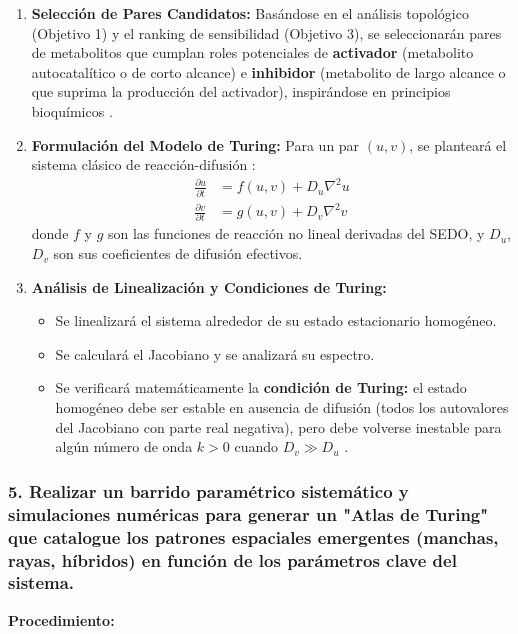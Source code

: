 \documentclass[12pt,spanish]{article}
\newcommand{\procedimiento}{\textbf{Procedimiento:}}
\begin{document}
	\begin{enumerate}
		\item \textbf{Selección de Pares Candidatos:} Basándose en el análisis topológico (Objetivo 1) y el ranking de sensibilidad (Objetivo 3), se seleccionarán pares de metabolitos que cumplan roles potenciales de \textbf{activador} (metabolito autocatalítico o de corto alcance) e \textbf{inhibidor} (metabolito de largo alcance o que suprima la producción del activador), inspirándose en principios bioquímicos \cite{Kondo2010}.
		
		\item \textbf{Formulación del Modelo de Turing:} Para un par $(u, v)$, se planteará el sistema clásico de reacción-difusión \cite{turing1952}:
		\begin{align*}
			\frac{\partial u}{\partial t} &= f(u,v) + D_u \nabla^2 u \\
			\frac{\partial v}{\partial t} &= g(u,v) + D_v \nabla^2 v
		\end{align*}
		donde $f$ y $g$ son las funciones de reacción no lineal derivadas del SEDO, y $D_u$, $D_v$ son sus coeficientes de difusión efectivos.
		
		\item \textbf{Análisis de Linealización y Condiciones de Turing:}
		\begin{itemize}
			\item Se linealizará el sistema alrededor de su estado estacionario homogéneo.
			\item Se calculará el Jacobiano y se analizará su espectro.
			\item Se verificará matemáticamente la \textbf{condición de Turing:} el estado homogéneo debe ser estable en ausencia de difusión (todos los autovalores del Jacobiano con parte real negativa), pero debe volverse inestable para algún número de onda $k > 0$ cuando $D_v \gg D_u$ \cite{alarcon2004, murray2012}.
		\end{itemize}
	\end{enumerate}
	
	\subsubsection*{5. Realizar un barrido paramétrico sistemático y simulaciones numéricas para generar un "Atlas de Turing" que catalogue los patrones espaciales emergentes (manchas, rayas, híbridos) en función de los parámetros clave del sistema.}
	
	\procedimiento
	
\end{document}
